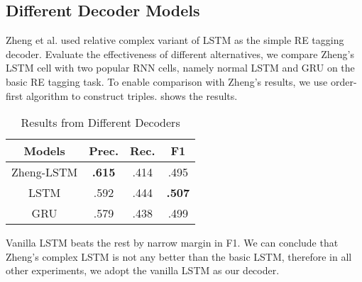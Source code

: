 \subsection{Different Decoder Models}
Zheng et al. used relative complex variant of LSTM as the simple RE tagging
decoder. Evaluate the effectiveness of different alternatives, 
we compare Zheng's LSTM cell with two popular
RNN cells, namely normal LSTM and GRU on the basic RE tagging task.
To enable comparison with Zheng's results, we use order-first algorithm to
construct triples.  shows the results.

\begin{table}[th!]
  \begin{center}
  \small
  \caption{Results from Different Decoders}
  \label{tab:decode}
    \begin{tabular}{c|ccc}
      \hline
      \bf Models & \bf Prec. & \bf Rec. & \bf F1 \\
      \hline
      Zheng-LSTM  & \textbf{.615} & .414 & .495 \\
      LSTM   & .592 & .444 & \textbf{.507} \\
      GRU    & .579 & .438 & .499 \\
      \hline
    \end{tabular}
  \end{center}
\end{table}

Vanilla LSTM beats the rest by narrow margin in F1. 
We can conclude that Zheng's complex LSTM is not any better than the
basic LSTM, therefore in all other experiments, we adopt the vanilla
LSTM as our decoder.


